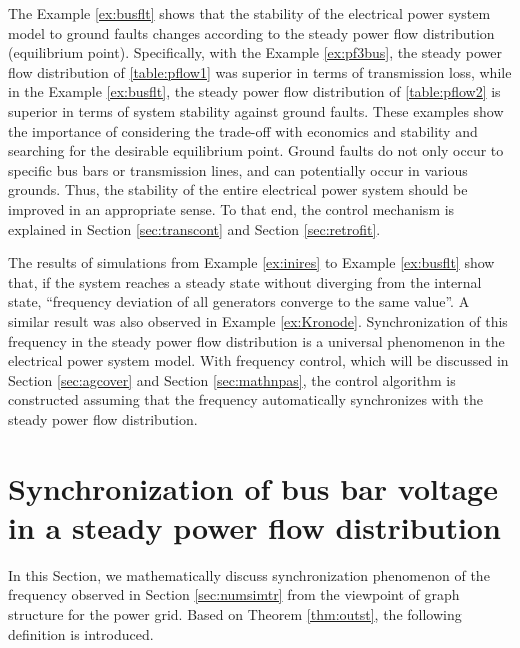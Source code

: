 \documentclass[tombow,dvipdfmx]{corona-a5-1.1}
\begin{document}
The Example \ref{ex:busflt} shows that the stability of the electrical power system model to ground faults changes according to the steady power flow distribution (equilibrium point).
Specifically, with the Example \ref{ex:pf3bus}, the steady power flow distribution of \ref{table:pflow1} was superior in terms of transmission loss, while in the Example \ref{ex:busflt}, the steady power flow distribution of \ref{table:pflow2} is superior in terms of system stability against ground faults.
These examples show the importance of considering the trade-off with economics and stability and searching for the desirable equilibrium point.
Ground faults do not only occur to specific bus bars or transmission lines, and can potentially occur in various grounds. Thus, the stability of the entire electrical power system should be improved in an appropriate sense.
To that end, the control mechanism is explained in Section \ref{sec:transcont} and Section \ref{sec:retrofit}.

The results of simulations from Example \ref{ex:inires} to Example \ref{ex:busflt} show that, if the system reaches a steady state without diverging from the internal state, “frequency deviation of all generators converge to the same value”.
A similar result was also observed in Example \ref{ex:Kronode}. Synchronization of this frequency in the steady power flow distribution is a universal phenomenon in the electrical power system model.
With frequency control, which will be discussed in Section \ref{sec:agcover} and Section \ref{sec:mathnpas}, the control algorithm is constructed assuming that the frequency automatically synchronizes with the steady power flow distribution.

\section{Synchronization of bus bar voltage in a steady power flow distribution\advanced}\label{sec:phsync}

In this Section, we mathematically discuss synchronization phenomenon of the frequency observed in Section \ref{sec:numsimtr} from the viewpoint of graph structure for the power grid.
Based on Theorem \ref{thm:outst}, the following definition is introduced.
\end{document}
